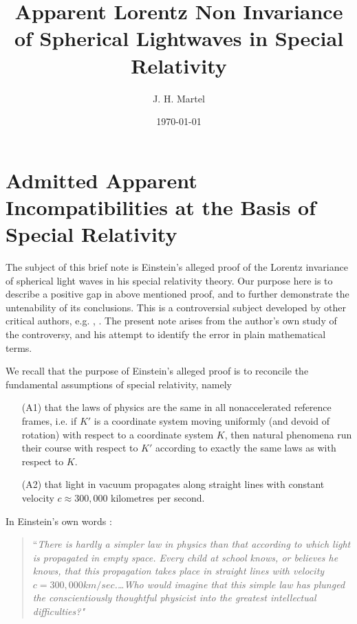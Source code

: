 \documentclass[12pt]{amsart}
\theoremstyle{definition}
\theoremstyle{remark}
\begin{document}
\title{Apparent Lorentz Non Invariance of Spherical Lightwaves in Special Relativity}


\author{J. H. Martel}
\date{\today}
\maketitle

\tableofcontents

\section{Admitted Apparent Incompatibilities at the Basis of Special Relativity}
The subject of this brief note is Einstein's alleged proof of the Lorentz invariance of spherical light waves in his special relativity theory. Our purpose here is to describe a positive gap in above mentioned proof, and to further demonstrate the untenability of its conclusions. This is a controversial subject developed by other critical authors, e.g. \cite{bryant}, \cite{crothers}. The present note arises from the author's own study of the controversy, and his attempt to identify the error in plain mathematical terms. 


We recall that the purpose of Einstein's alleged proof \cite{einstein2019relativity} is to reconcile the fundamental assumptions of special relativity, namely
\begin{itemize}

\item[(A1)] that the laws of physics are the same in all nonaccelerated reference frames, i.e. if $K'$ is a coordinate system moving uniformly (and devoid of rotation) with respect to a coordinate system $K$, then natural phenomena run their course with respect to $K'$ according to exactly the same laws as with respect to $K$. 

\item[(A2)] that light in vacuum propagates along straight lines with constant velocity $c\approx 300,000$ kilometres per second.

\end{itemize}

In Einstein's own words \cite[Ch.7, 11]{einstein2019relativity}:

\begin{quote} 
``\emph{There is hardly a simpler law in physics than that according to which light is propagated in empty space. Every child at school knows, or believes he knows, that this propagation takes place in straight lines with velocity $c=300, 000 km/sec$.\ldots Who would imagine that this simple law has plunged the conscientiously thoughtful physicist into the greatest intellectual difficulties?"} 
\end{quote}
\end{document}
